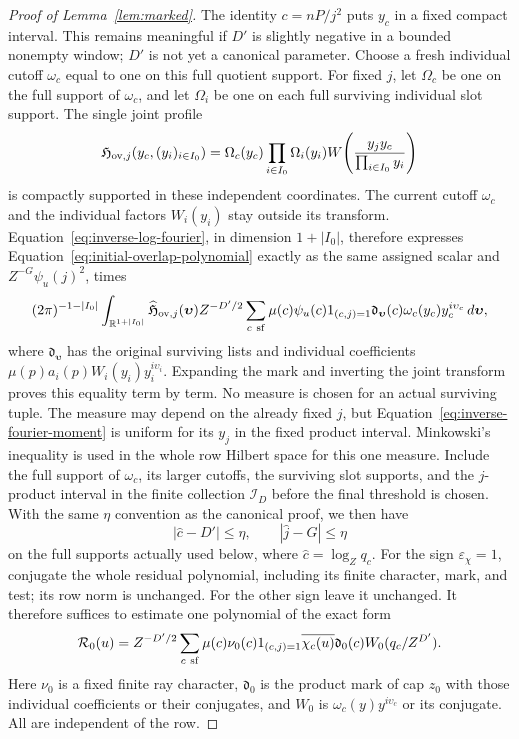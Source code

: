 \documentclass[11pt,a4paper]{article}
\numberwithin{equation}{section}
\numberwithin{figure}{section}
\theoremstyle{definition}
\theoremstyle{remark}
\begin{document}
\begin{proof}[Proof of Lemma~\ref{lem:marked}]
The identity \(c=nP/j^2\) puts \(y_c\) in a fixed compact interval.
This remains meaningful if \(D'\) is slightly negative in a bounded
nonempty window; \(D'\) is not yet a canonical parameter.  Choose a
fresh individual cutoff \(\omega_c\) equal to one on this full quotient
support.  For fixed \(j\), let \(\Omega_c\) be one on the full support
of \(\omega_c\), and let \(\Omega_i\) be one on each full surviving
individual slot support.  The single joint profile
\[
 \mathfrak H_{{\rm ov},j}(y_c,(y_i)_{i\in I_0})
 =\Omega_c(y_c)\prod_{i\in I_0}\Omega_i(y_i)
 W\!\left(\frac{y_jy_c}{\prod_{i\in I_0}y_i}\right)
\]
is compactly supported in these independent coordinates.  The current
cutoff \(\omega_c\) and the individual factors \(W_i(y_i)\) stay outside
its transform.  Equation~\eqref{eq:inverse-log-fourier}, in dimension
\(1+|I_0|\), therefore expresses Equation~\eqref{eq:initial-overlap-polynomial}
exactly as the same assigned scalar and \(Z^{-G}\psi_u(j)^2\), times
\[
 (2\pi)^{-1-|I_0|}\int_{\mathbb R^{1+|I_0|}}
 \widehat{\mathfrak H}_{{\rm ov},j}(\boldsymbol\upsilon)
 Z^{-D'/2}\sum_{c\ {\rm sf}}\mu(c)\psi_u(c)1_{(c,j)=1}
 \mathfrak d_{\boldsymbol\upsilon}(c)
 \omega_c(y_c)y_c^{i\upsilon_c}\,d\boldsymbol\upsilon,
\]
where \(\mathfrak d_{\boldsymbol\upsilon}\) has the original surviving
lists and individual coefficients
\(\mu(p)a_i(p)W_i(y_i)y_i^{i\upsilon_i}\).  Expanding the mark and
inverting the joint transform proves this equality term by term.
No measure is chosen for an actual surviving tuple.  The measure may
depend on the already fixed \(j\), but Equation~\eqref{eq:inverse-fourier-moment}
is uniform for its \(y_j\) in the fixed product interval.  Minkowski's
inequality is used in the whole row Hilbert space for this one measure.
Include the full support of \(\omega_c\), its larger cutoffs, the
surviving slot supports, and the \(j\)-product interval in the finite
collection \(\mathcal I_D\) before the final threshold is chosen.
With the same \(\eta\) convention as the canonical proof, we then have
\[
 |\widehat c-D'|\le\eta,\qquad |\widehat j-G|\le\eta
\]
on the full supports actually used below, where \(\widehat c=\log_Zq_c\).
For the sign
\(\varepsilon_\chi=1\), conjugate the whole residual polynomial,
including its finite character, mark, and test; its row norm is unchanged.
For the other sign leave it unchanged.  It therefore suffices to estimate
one polynomial of the exact form
\begin{equation}\label{eq:initial-residual-polynomial}
 \mathcal R_0(u)=Z^{-D'/2}\sum_{c\ {\rm sf}}
 \mu(c)\nu_0(c)1_{(c,j)=1}\overline{\chi_c(u)}
 \mathfrak d_0(c)W_0(q_c/Z^{D'}).
\end{equation}
Here \(\nu_0\) is a fixed finite ray character, \(\mathfrak d_0\)
is the product mark of cap \(z_0\) with those individual coefficients
or their conjugates, and \(W_0\) is \(\omega_c(y)y^{i\upsilon_c}\)
or its conjugate.  All are independent of the row.


\end{proof}
\end{document}
